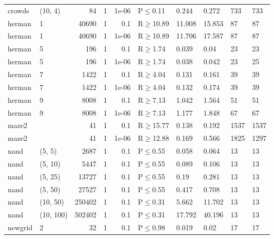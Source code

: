 \begin{longtable}{llrrrlllll}
 crowds        & (10, 4)   &     	84 & 1 & 1e-06 & P$\leq$0.11  & 0.244  & 0.272  & 733     & 733     \\
 herman        & 1         &  	40690 & 1 & 0.1   & R$\geq$10.89 & 11.008 & 15.853 & 87      & 87      \\
 herman        & 1         &  	40690 & 1 & 1e-06 & R$\geq$10.89 & 11.706 & 17.587 & 87      & 87      \\
 herman        & 5         &    	196 & 1 & 0.1   & R$\geq$1.74  & 0.039  & 0.04   & 23      & 23      \\
 herman        & 5         &    	196 & 1 & 1e-06 & R$\geq$1.74  & 0.038  & 0.042  & 23      & 25      \\
 herman        & 7         &   	1422 & 1 & 0.1   & R$\geq$4.04  & 0.131  & 0.161  & 39      & 39      \\
 herman        & 7         &   	1422 & 1 & 1e-06 & R$\geq$4.04  & 0.132  & 0.174  & 39      & 39      \\
 herman        & 9         &   	8008 & 1 & 0.1   & R$\geq$7.13  & 1.042  & 1.564  & 51      & 51      \\
 herman        & 9         &   	8008 & 1 & 1e-06 & R$\geq$7.13  & 1.177  & 1.848  & 67      & 67      \\
 maze2         &           &     	41 & 1 & 0.1   & R$\geq$15.77 & 0.138  & 0.192  & 1537    & 1537    \\
 maze2         &           &     	41 & 1 & 1e-06 & R$\geq$12.88 & 0.169  & 0.566  & 1825    & 1297    \\
 nand          & (5, 5)    &   	2687 & 1 & 0.1   & P$\leq$0.55  & 0.058  & 0.064  & 13      & 13      \\
 nand          & (5, 10)   &   	5447 & 1 & 0.1   & P$\leq$0.55  & 0.089  & 0.106  & 13      & 13      \\
 nand          & (5, 25)   &  	13727 & 1 & 0.1   & P$\leq$0.55  & 0.19   & 0.281  & 13      & 13      \\
 nand          & (5, 50)   &  	27527 & 1 & 0.1   & P$\leq$0.55  & 0.417  & 0.708  & 13      & 13      \\
 nand          & (10, 50)  & 	250402 & 1 & 0.1   & P$\leq$0.31  & 5.662  & 11.702 & 13      & 13      \\
 nand          & (10, 100) & 	502402 & 1 & 0.1   & P$\leq$0.31  & 17.792 & 40.196 & 13      & 13      \\
 newgrid       & 2         &     	32 & 1 & 0.1   & P$\leq$0.98  & 0.019  & 0.02   & 17      & 17      \\

\end{longtable}
